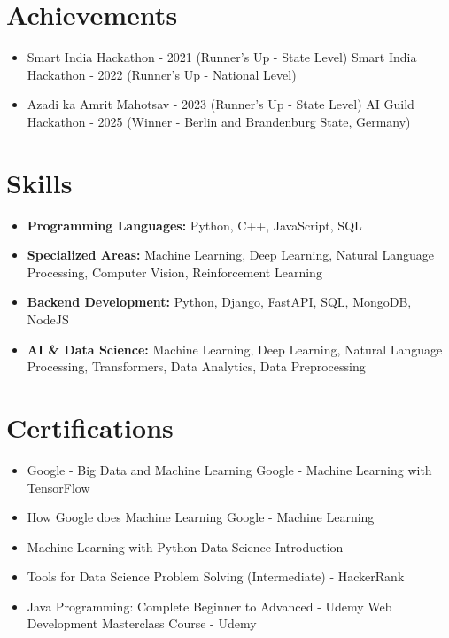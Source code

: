 \documentclass[a4paper,10pt]{article}
\begin{document}
\section*{Achievements}
\begin{itemize}
\item Smart India Hackathon - 2021 (Runner's Up - State Level) \hfill Smart India Hackathon - 2022 (Runner's Up - National Level)
\item Azadi ka Amrit Mahotsav - 2023 (Runner's Up - State Level) \hfill AI Guild Hackathon - 2025 (Winner - Berlin and Brandenburg State, Germany)
\end{itemize}

\section*{Skills}
\begin{itemize}
  \item \textbf{Programming Languages:} Python, C++, JavaScript, SQL
  \item \textbf{Specialized Areas:} Machine Learning, Deep Learning, Natural Language Processing, Computer Vision, Reinforcement Learning
  \item \textbf{Backend Development:} Python, Django, FastAPI, SQL, MongoDB, NodeJS
  \item \textbf{AI \& Data Science:} Machine Learning, Deep Learning, Natural Language Processing, Transformers, Data Analytics, Data Preprocessing
\end{itemize}

\section*{Certifications}
\begin{itemize}
\item Google - Big Data and Machine Learning \hfill Google - Machine Learning with TensorFlow
\item How Google does Machine Learning \hfill Google - Machine Learning
\item Machine Learning with Python \hfill Data Science Introduction
\item Tools for Data Science \hfill Problem Solving (Intermediate) - HackerRank
\item Java Programming: Complete Beginner to Advanced - Udemy \hfill Web Development Masterclass Course - Udemy
\end{itemize}
\end{document}
